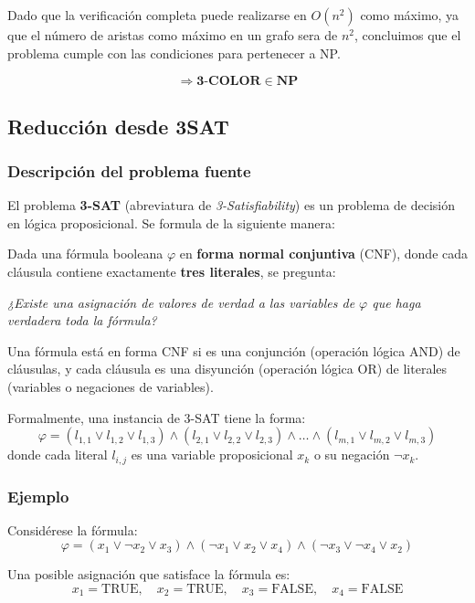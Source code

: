 \documentclass[a4paper,12pt]{article}
\begin{document}
Dado que la verificación completa puede realizarse en \( O(n^2) \) como máximo, ya que el número de aristas como máximo en un grafo sera de \( n^2 \), concluimos que el problema cumple con las condiciones para pertenecer a NP.

\[
\Rightarrow \textbf{3-COLOR} \in \textbf{NP}
\]

\subsection{Reducción desde 3SAT}

\subsubsection{Descripción del problema fuente}

El problema \textbf{3-SAT} (abreviatura de \emph{3-Satisfiability}) es un problema de decisión en lógica proposicional. Se formula de la siguiente manera:

Dada una fórmula booleana $\varphi$ en \textbf{forma normal conjuntiva} (CNF), donde cada cláusula contiene exactamente \textbf{tres literales}, se pregunta:

\begin{center}
\emph{¿Existe una asignación de valores de verdad a las variables de $\varphi$ que haga verdadera toda la fórmula?}
\end{center}

Una fórmula está en forma CNF si es una conjunción (operación lógica AND) de cláusulas, y cada cláusula es una disyunción (operación lógica OR) de literales (variables o negaciones de variables).

Formalmente, una instancia de 3-SAT tiene la forma:
\[
\varphi = (l_{1,1} \lor l_{1,2} \lor l_{1,3}) \land (l_{2,1} \lor l_{2,2} \lor l_{2,3}) \land \dots \land (l_{m,1} \lor l_{m,2} \lor l_{m,3})
\]
donde cada literal $l_{i,j}$ es una variable proposicional $x_k$ o su negación $\neg x_k$.

\subsubsection{Ejemplo}

Considérese la fórmula:
\[
\varphi = (x_1 \lor \neg x_2 \lor x_3) \land (\neg x_1 \lor x_2 \lor x_4) \land (\neg x_3 \lor \neg x_4 \lor x_2)
\]

Una posible asignación que satisface la fórmula es:
\[
x_1 = \text{TRUE}, \quad x_2 = \text{TRUE}, \quad x_3 = \text{FALSE}, \quad x_4 = \text{FALSE}
\]
\end{document}
